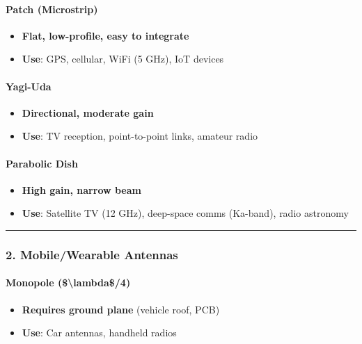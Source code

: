 \paragraph{Patch (Microstrip)}\label{patch-microstrip}

\begin{itemize}
\tightlist
\item
  \textbf{Flat, low-profile, easy to integrate}
\item
  \textbf{Use}: GPS, cellular, WiFi (5 GHz), IoT devices
\end{itemize}

\paragraph{Yagi-Uda}\label{yagi-uda}

\begin{itemize}
\tightlist
\item
  \textbf{Directional, moderate gain}
\item
  \textbf{Use}: TV reception, point-to-point links, amateur radio
\end{itemize}

\paragraph{Parabolic Dish}\label{parabolic-dish}

\begin{itemize}
\tightlist
\item
  \textbf{High gain, narrow beam}
\item
  \textbf{Use}: Satellite TV (12 GHz), deep-space comms (Ka-band), radio
  astronomy
\end{itemize}

\begin{center}\rule{0.5\linewidth}{0.5pt}\end{center}

\subsubsection{2. Mobile/Wearable
Antennas}\label{mobilewearable-antennas}

\paragraph{Monopole
(\$\textbackslash lambda\$/4)}\label{monopole-ux3bb4}

\begin{itemize}
\tightlist
\item
  \textbf{Requires ground plane} (vehicle roof, PCB)
\item
  \textbf{Use}: Car antennas, handheld radios
\end{itemize}

